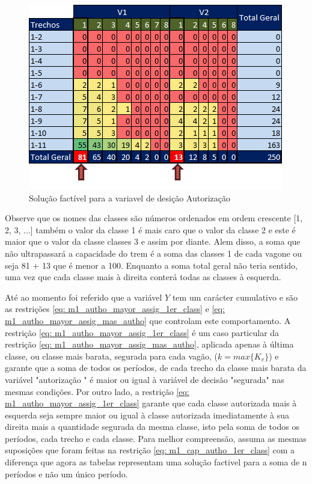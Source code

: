 \begin{figure}[!ht]
	\begin{center}
		\includegraphics[scale=0.7]{img/autorization.png}
		\caption{Solução factível para a variavel de desição Autorização}
		\label{fig: autorization}
	\end{center}
\end{figure}

Observe que os nomes das classes são números ordenados em ordem crescente [1, 2, 3, ...] também o valor da classe 1 é mais caro que o valor da classe 2 e este é maior que o valor da classe classes 3 e assim por diante. Alem disso, a soma que não ultrapassará a capacidade do trem é a soma das classes 1 de cada vagone ou seja 81 + 13 que é menor a 100. Enquanto a soma total geral não teria sentido, uma vez que cada classe mais à direita conterá todas as classes à esquerda.


Até ao momento foi referido que a variável $Y$ tem um carácter cumulativo e são as restrições \ref{eq: m1_autho_mayor_assig_1er_class} e \ref{eq: m1_autho_mayor_assig_mas_autho} que controlam este comportamento. A restrição \ref{eq: m1_autho_mayor_assig_1er_class} é um caso particular da restrição \ref{eq: m1_autho_mayor_assig_mas_autho}, aplicada apenas à última classe, ou classe mais barata, segurada para cada vagão, ($k=max\{K_v\}$) e garante que a soma de todos os períodos, de cada trecho da classe mais barata da variável "autorização " é maior ou igual à variável de decisão "segurada" nas mesmas condições. Por outro lado, a restrição \ref{eq: m1_autho_mayor_assig_1er_class} garante que cada classe autorizada mais à esquerda seja sempre maior ou igual à classe autorizada imediatamente à sua direita mais a quantidade segurada da mesma classe, isto pela soma de todos os períodos, cada trecho e cada classe. Para melhor compreensão, assuma as mesmas suposições que foram feitas na restrição \ref{eq: m1_cap_autho_1er_class} com a diferença que agora as tabelas representam uma solução factivel para a soma de n períodos e não um único período.


